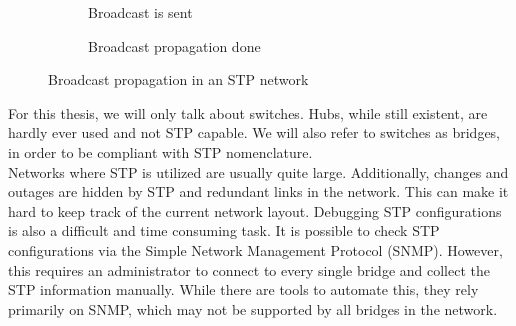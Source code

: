 \begin{figure}
    \begin{centering}
        \begin{subfigure}[b]{0.4\textwidth}
            \caption{Broadcast is sent}
        \end{subfigure}
        \hspace{1cm}
        \begin{subfigure}[b]{0.4\textwidth}
            \caption{Broadcast propagation done}
        \end{subfigure}    
    \end{centering}
    \caption{Broadcast propagation in an STP network}
    \label{fig:stp_example}
\end{figure}
For this thesis, we will only talk about switches.
Hubs, while still existent, are hardly ever used and not STP capable.
We will also refer to switches as bridges, in order to be compliant with STP nomenclature.\\

Networks where STP is utilized are usually quite large.
Additionally, changes and outages are hidden by STP and redundant links in the network.
This can make it hard to keep track of the current network layout.
Debugging STP configurations is also a difficult and time consuming task.
It is possible to check STP configurations via the Simple Network Management Protocol (SNMP).
However, this requires an administrator to connect to every single bridge and collect the STP information manually.
While there are tools to automate this, they rely primarily on SNMP, which may not be supported by all bridges in the network.\\

